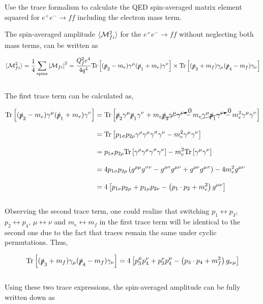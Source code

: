 \begin{problem}{6.10}
Use the trace formalism to calculate the QED spin-averaged matrix element squared for $e^+e^-\to ff$ including the electron mass term.
\end{problem}
\begin{solution}
The spin-averaged amplitude $\langle \mathcal{M}_{fi}^2 \rangle$ for the $e^+e^-\to ff$ without neglecting both mass terms, can be written as 

\begin{align*}
    \langle \mathcal{M}_{fi}^2 \rangle = \frac{1}{4} \sum_{\text{spins}} \left| \mathcal{M}_{fi}\right|^2 = \frac{Q_f^2 e^4}{4q^4} \text{Tr}\left[ (\slashed{p}_2 - m_e) \gamma^\mu (\slashed{p}_1 + m_e) \gamma^\nu \right] \times \text{Tr}\left[ (\slashed{p}_3 + m_f) \gamma_\mu (\slashed{p}_4 - m_f) \gamma_\nu \right]
\end{align*}\\
The first trace term can be calculated as,

\begin{align*}
    \text{Tr}\left[ (\slashed{p}_2 - m_e) \gamma^\mu (\slashed{p}_1 + m_e) \gamma^\nu \right] &= \text{Tr} \left[  \slashed{p}_2\gamma^\mu\slashed{p}_1\gamma^\nu + m_e\cancelto{0}{ \slashed{p}_2 \gamma^\mu \gamma^\nu}  - m_e \cancelto{0}{\gamma^\mu \slashed{p}_1 \gamma^\nu}    -m_e^2 \gamma^\mu \gamma^\nu \right] \\[0.12in]
    &= \text{Tr} \left[  p_{1\sigma}p_{2\rho}\gamma^\rho \gamma^\mu \gamma^\sigma \gamma^\nu -m_e^2 \gamma^\mu \gamma^\nu \right] \\[0.12in]
    &= p_{1\sigma}p_{2\rho} \text{Tr} \left[  \gamma^\rho \gamma^\mu \gamma^\sigma \gamma^\nu \right] -m_e^2  \text{Tr} \left[ \gamma^\mu \gamma^\nu \right] \\[0.12in]
    &= 4 p_{1\sigma}p_{2\rho} \left( g^{\rho\mu} g^{\sigma\nu} - g^{\rho\sigma}g^{\mu\nu} + g^{\rho\nu}g^{\mu\sigma} \right) -4 m_e^2 g^{\mu\nu} \\[0.12in]
    &= 4\left[ p_{1\nu}p_{2\mu} + p_{1\mu}p_{2\nu} -\left( p_1\cdot p_2 + m_e^2 \right) g^{\mu\nu}\right]
\end{align*}\\
Observing the second trace term, one could realize that switching $p_1\leftrightarrow p_3$, $p_2\leftrightarrow p_4$, $\mu \leftrightarrow \nu$ and $m_e \leftrightarrow m_f$ in the first trace term will be identical to the second one due to the fact that traces remain the same under cyclic permutations. Thus,

\begin{align*}
    \text{Tr}\left[ (\slashed{p}_3 + m_f) \gamma_\mu (\slashed{p}_4 - m_f) \gamma_\nu \right] = 4\left[ p_3^\mu p_4^\nu + p_3^\nu p_4^\mu -\left( p_3\cdot p_4 + m_f^2 \right) g_{\nu\mu}\right]
\end{align*}\\
Using these two trace expressions, the spin-averaged amplitude can be fully written down as 


\end{solution}
